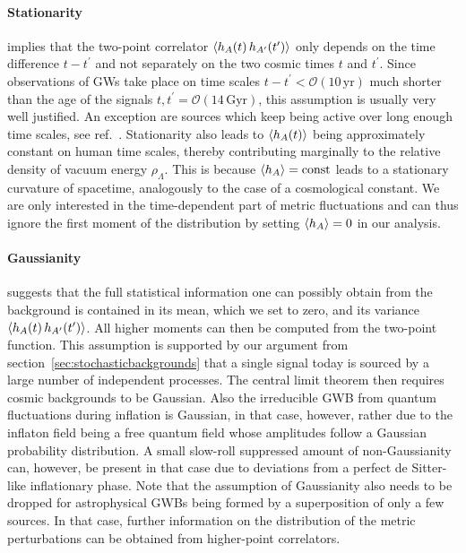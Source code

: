 \paragraph{Stationarity} implies that the two-point correlator $\langle h_A(t)\,  h_{A^\prime}(t^\prime) \rangle$ only depends on the time difference $t-t^\prime$ and not separately on the two cosmic times $t$ and $t^\prime$. Since observations of \acp{GW} take place on time scales $t - t^\prime < \mathcal{O}(10 \, \text{yr})$ much shorter than the age of the signals $t, t^\prime = \mathcal{O}(14 \, \text{Gyr})$, this assumption is usually very well justified. An exception are sources which keep being active over long enough time scales, see ref.~\cite{daCunha:2021wyy}. Stationarity also  leads to $\langle h_A(t) \rangle$ being approximately constant on human time scales, thereby contributing marginally to the relative density of vacuum energy $\rho_\Lambda$. This is because $\langle h_A \rangle = \text{const}$ leads to a stationary curvature of spacetime, analogously to the case of a cosmological constant. We are only interested in the time-dependent part of metric fluctuations and can thus ignore the first moment of the distribution by setting $\langle h_A \rangle = 0$ in our analysis.

\paragraph{Gaussianity} suggests that the full statistical information one can possibly obtain from the background is contained in its mean, which we set to zero, and its variance $\langle h_A(t) \, h_{A^\prime}(t^\prime) \rangle$. All higher moments can then be computed from the two-point function. This assumption is supported by our argument from section~\ref{sec:stochasticbackgrounds} that a single signal today is sourced by a large number of independent processes. The central limit theorem then requires cosmic backgrounds to be Gaussian. Also the irreducible \ac{GWB} from quantum fluctuations during inflation is Gaussian, in that case, however, rather due to the inflaton  field being a free quantum field whose amplitudes follow a Gaussian probability distribution. A small slow-roll suppressed amount of non-Gaussianity can, however, be present in that case due to deviations from a perfect de Sitter-like inflationary phase. Note that the assumption of Gaussianity also needs to be dropped for astrophysical \acp{GWB} being formed by a superposition of only a few sources. In that case, further information on the distribution of the metric perturbations can be obtained from higher-point correlators. 

